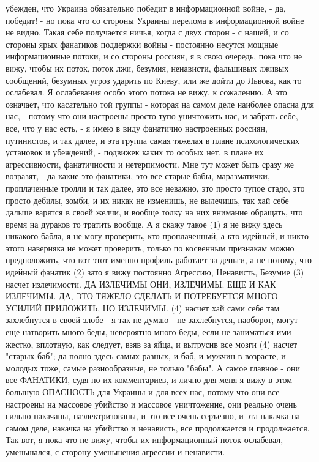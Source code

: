 убежден, что Украина обязательно победит в информационной войне, - да, победит!
- но пока что со стороны Украины перелома в информационной войне не видно.
Такая себе получается ничья, когда с двух сторон - с нашей, и со стороны ярых
фанатиков поддержки войны - постоянно несутся мощные информационные потоки, и
со стороны россиян, я в свою очередь, пока что не вижу, чтобы их поток, поток
лжи, безумия, ненависти, фальшивых лживых сообщений, безумных угроз ударить по
Киеву, или же дойти до Львова, как то ослабевал. Я ослабевания особо этого
потока не вижу, к сожалению.  А это означает, что касательно той группы -
которая на самом деле наиболее опасна для нас, - потому что они настроены
просто тупо уничтожить нас, и забрать себе, все, что у нас есть, - я имею в
виду фанатично настроенных россиян, путинистов, и так далее, и эта группа самая
тяжелая в плане психологических установок и убеждений, - подвижек каких то
особых нет, в плане их агрессивности, фанатичности и нетерпимости. Мне тут
может быть сразу же возразят, - да какие это фанатики, это все старые бабы,
маразматички, проплаченные тролли и так далее, это все неважно, это просто
тупое стадо, это просто дебилы, зомби, и их никак не изменишь, не вылечишь, так
хай себе дальше варятся в своей желчи, и вообще толку на них внимание обращать,
что время на дураков то тратить вообще.  А я скажу такое (1) я не вижу здесь
никакого бабла, я не могу проверить, кто проплаченный, а кто идейный, и никто
этого наверняка не может проверить, только по косвенным признакам можно
предположить, что вот этот именно профиль работает за деньги, а не потому, что
идейный фанатик (2) зато я вижу постоянно Агрессию, Ненависть, Безумие (3)
насчет излечимости. ДА ИЗЛЕЧИМЫ ОНИ, ИЗЛЕЧИМЫ. ЕЩЕ И КАК ИЗЛЕЧИМЫ. ДА, ЭТО
ТЯЖЕЛО СДЕЛАТЬ И ПОТРЕБУЕТСЯ МНОГО УСИЛИЙ ПРИЛОЖИТЬ, НО ИЗЛЕЧИМЫ. (4) насчет
хай сами себе там захлебнутся в своей злобе - я так не думаю - не захлебнутся,
наоборот, могут еще натворить много беды, невероятно много беды, если не
заниматься ими жестко, вплотную, как следует, взяв за яйца, и вытрусив все
мозги (4) насчет "старых баб"; да полно здесь самых разных, и баб, и мужчин в
возрасте, и молодых тоже, самые разнообразные, не только "бабы". А самое
главное - они все ФАНАТИКИ, судя по их комментариев, и лично для меня я вижу в
этом большую ОПАСНОСТЬ для Украины и для всех нас, потому что они все настроены
на массовое убийство и массовое уничтожение, они реально очень сильно накачаны,
наэлектризованы, и это все очень серъезно, и эта накачка на самом деле, накачка
на убийство и ненависть, все продолжается и продолжается. Так вот, я пока что
не вижу, чтобы их информационный поток ослабевал, уменьшался, с сторону
уменьшения агрессии и ненависти.

